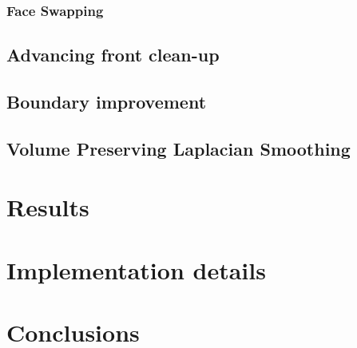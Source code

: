 \documentclass[11pt, a4paper]{paper}
\begin{document}
\subsubsection{ Face Swapping }
\subsection { Advancing front clean-up}
\subsection { Boundary improvement}
\subsection { Volume Preserving Laplacian Smoothing}
\section {Results}
\section { Implementation details }

\section {Conclusions}
\end{document}

